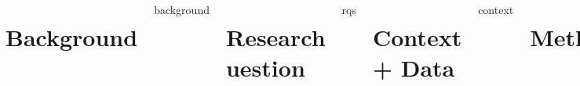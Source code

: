 \documentclass{poster}
\begin{document}
  \maketitle
  \begin{columns}
    \section{Background}{background}
    \section{Research uestion}{rqs}
    \section{Context + Data}{context}
    \section{Methods}{methods}
    \section{Results}{results}
    \section{Summary of Assumption Effects}{summary}
    \section{Interpretation}{interpretation}
    \section{Thanks}{thanks}
    \section{References}{refs}
    \block[bodyinnersep=0mm]{}{}
  \end{columns}
\end{document}
